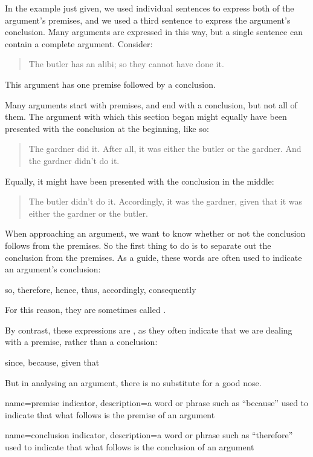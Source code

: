 In the example just given, we used individual sentences to express both of the argument's premises, and we used a third sentence to express the argument's conclusion. Many arguments are expressed in this way, but a single sentence can contain a complete argument. Consider:
	\begin{quote}
		 The butler has an alibi; so they cannot have done it.
	\end{quote}
This argument has one premise followed by a conclusion. 

Many arguments start with premises, and end with a conclusion, but not all of them. The argument with which this section began might equally have been presented with the conclusion at the beginning, like so:
	\begin{quote}
		The gardner did it. After all, it was either the butler or the
		gardner. And the gardner didn't do it. 
	\end{quote}
Equally, it might have been presented with the conclusion in the middle:
	\begin{quote}
		The butler didn't do it. Accordingly, it was the gardner,
		given that it was either the gardner or the butler.
	\end{quote}
When approaching an argument, we want to know whether or not the conclusion follows from the premises. So the first thing to do is to separate out the conclusion from the premises. As a guide, these words are often used to indicate an argument's conclusion:
	\begin{center}
		so, therefore, hence, thus, accordingly, consequently
	\end{center}
For this reason, they are sometimes called .

By contrast, these expressions are ,
as they often indicate that we are dealing with a premise, rather than a
conclusion:
	\begin{center}
		since, because, given that
	\end{center}
But in analysing an argument, there is no substitute for a good nose.

{
name=premise indicator,
description={a word or phrase such as ``because'' used to indicate that what follows is the premise of an argument}
}

{
name=conclusion indicator,
description={a word or phrase such as ``therefore'' used to indicate that what follows is the conclusion of an argument}
}

